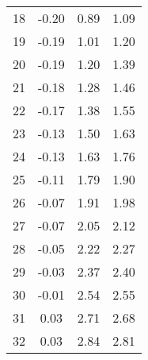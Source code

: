\begin{longtable}[c]{cccc}
	18                       & -0.20                                   & 0.89                                    & 1.09                       \\
	19                       & -0.19                                   & 1.01                                    & 1.20                       \\
	20                       & -0.19                                   & 1.20                                    & 1.39                       \\
	21                       & -0.18                                   & 1.28                                    & 1.46                       \\
	22                       & -0.17                                   & 1.38                                    & 1.55                       \\
	23                       & -0.13                                   & 1.50                                    & 1.63                       \\
	24                       & -0.13                                   & 1.63                                    & 1.76                       \\
	25                       & -0.11                                   & 1.79                                    & 1.90                       \\
	26                       & -0.07                                   & 1.91                                    & 1.98                       \\
	27                       & -0.07                                   & 2.05                                    & 2.12                       \\
	28                       & -0.05                                   & 2.22                                    & 2.27                       \\
	29                       & -0.03                                   & 2.37                                    & 2.40                       \\
	30                       & -0.01                                   & 2.54                                    & 2.55                       \\
	31                       & 0.03                                    & 2.71                                    & 2.68                       \\
	32                       & 0.03                                    & 2.84                                    & 2.81                       \\

\end{longtable}
